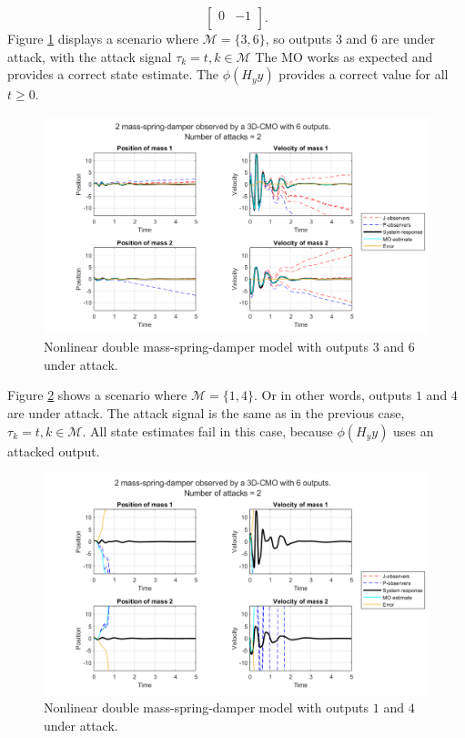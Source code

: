 \begin{example}
\begin{equation}
\begin{bmatrix}
            0 & -1 \\
        \end{bmatrix}.
    \end{equation}
    Figure \ref{fig:nonlinear-functional} displays a scenario where $\mathcal{M}=\{3,6\}$, so outputs $3$ and $6$ are under attack, with the attack signal $\tau_k=t,k \in \mathcal{M}$ The MO works as expected and provides a correct state estimate. The $\phi(H_yy)$ provides a correct value for all $t \geq 0$.
    \begin{figure}[H]
        \centering
        \includegraphics[width=\linewidth]{report/Figures/nonlinear_functional.png}
        \caption{Nonlinear double mass-spring-damper model with outputs $3$ and $6$ under attack.}
        \label{fig:nonlinear-functional}
    \end{figure}
    Figure \ref{fig:nonlinear-not-functional} shows a scenario where $\mathcal{M}=\{1,4\}$. Or in other words, outputs $1$ and $4$ are under attack. The attack signal is the same as in the previous case, $\tau_k=t,k \in \mathcal{M}$. All state estimates fail in this case, because $\phi(H_yy)$ uses an attacked output.

    \begin{figure}[H]
        \centering
        \includegraphics[width=\linewidth]{report/Figures/nonlinear_not_functional.png}
        \caption{Nonlinear double mass-spring-damper model with outputs $1$ and $4$ under attack.}
        \label{fig:nonlinear-not-functional}
    \end{figure}
\end{example}

